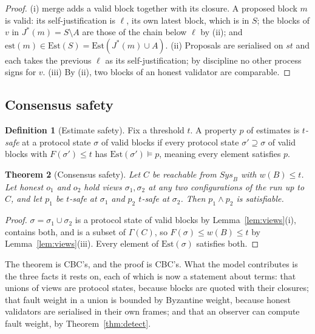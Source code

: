 \documentclass[11pt]{article}
\newtheorem{theorem}{Theorem}[section]
\theoremstyle{definition}
\newtheorem{definition}[theorem]{Definition}
\theoremstyle{remark}
\newcommand{\Jst}{J^{*}}
\newcommand{\est}{\mathrm{est}}
\newcommand{\Est}{\mathrm{Est}}
\newcommand{\merge}{\mathrm{merge}}
\newcommand{\Gam}{\Gamma}
\begin{document}
\begin{proof}
(i) $\merge$ adds a valid block together with its closure. A proposed block
$m$ is valid: its self-justification is $\ell$, its own latest block, which is
in $S$; the blocks of $v$ in $\Jst(m)=S\setminus A$ are those of the chain
below $\ell$ by (ii); and $\est(m)\in\Est(S)=\Est(\Jst(m)\cup A)$.
(ii) Proposals are serialised on $\mathit{st}$ and each takes the previous
$\ell$ as its self-justification; by discipline no other process signs for
$v$. (iii) By (ii), two blocks of an honest validator are comparable.
\end{proof}

\subsection{Consensus safety}

\begin{definition}[Estimate safety]
Fix a threshold $t$. A property $p$ of estimates is \emph{$t$-safe} at a
protocol state $\sigma$ of valid blocks if every protocol state
$\sigma'\supseteq\sigma$ of valid blocks with $F(\sigma')\le t$ has
$\Est(\sigma')\models p$, meaning every element satisfies $p$.
\end{definition}

\begin{theorem}[Consensus safety]\label{thm:safety}
Let $C$ be reachable from $\mathit{Sys}_B$ with $w(B)\le t$. Let honest $o_1$
and $o_2$ hold views $\sigma_1,\sigma_2$ at any two configurations of the run
up to $C$, and let $p_1$ be $t$-safe at $\sigma_1$ and $p_2$ $t$-safe at
$\sigma_2$. Then $p_1\wedge p_2$ is satisfiable.
\end{theorem}

\begin{proof}
$\sigma=\sigma_1\cup\sigma_2$ is a protocol state of valid blocks by
Lemma~\ref{lem:views}(i), contains both, and is a subset of $\Gam(C)$, so
$F(\sigma)\le w(B)\le t$ by Lemma~\ref{lem:views}(iii). Every element of
$\Est(\sigma)$ satisfies both.
\end{proof}

The theorem is CBC's, and the proof is CBC's. What the model contributes is the
three facts it rests on, each of which is now a statement about terms: that
unions of views are protocol states, because blocks are quoted with their
closures; that fault weight in a union is bounded by Byzantine weight, because
honest validators are serialised in their own frames; and that an observer can
compute fault weight, by Theorem~\ref{thm:detect}.
\end{document}
